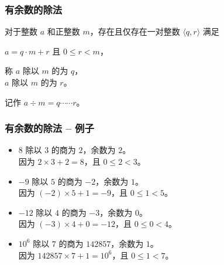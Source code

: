 \documentclass{../pkslide}
\begin{document}
\begin{frame}
  \frametitle{有余数的除法}
  
  \begin{definition}[有余数的除法]
    对于整数 $a$ 和正整数 $m$，存在且仅存在一对整数 $\langle q, r \rangle$ 满足%
    \begin{center}
      $a = q \cdot m + r$ 且 $0 \le r < m$，
    \end{center}%
    称 $a$ 除以 $m$ 的\hspace{.5em}\hspace{.5em}为 $q$，\\
    \-\hspace{1em} $a$ 除以 $m$ 的为 $r$。
    
    记作 $a \div m = q \cdots \cdots r$。
  \end{definition}
\end{frame}

\begin{frame}
  \frametitle{有余数的除法 -- 例子}
  
  \begin{examples}[有余数的除法]
    \begin{itemize}
      \item $8$ 除以 $3$ 的商为 $2$，余数为 $2$。\\
        因为 $2 \times 3 + 2 = 8$，且 $0 \le 2 < 3$。
      \item $-9$ 除以 $5$ 的商为 $-2$，余数为 $1$。\\
        因为 $(-2) \times 5 + 1 = -9$，且 $0 \le 1 < 5$。
      \item $-12$ 除以 $4$ 的商为 $-3$，余数为 $0$。\\
        因为 $(-3) \times 4 + 0 = -12$，且 $0 \le 0 < 4$。
      \item ${10}^6$ 除以 $7$ 的商为 $142857$，余数为 $1$。\\
        因为 $142857 \times 7 + 1 = {10}^6$，且 $0 \le 1 < 7$。
    \end{itemize}
  \end{examples}
  
\end{frame}
\end{document}
